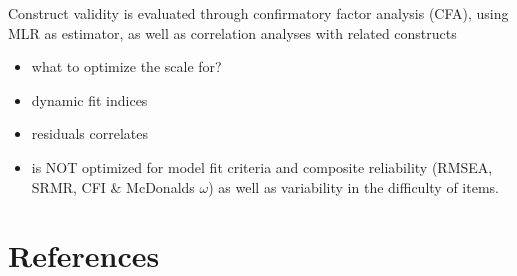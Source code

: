\documentclass[
  12pt,
  a4paper,
  twoside]{article}
\providecommand{\tightlist}{%
  \setlength{\itemsep}{0pt}\setlength{\parskip}{0pt}}
\begin{document}
Construct validity is evaluated through confirmatory factor analysis (CFA), using MLR as estimator, as well as correlation analyses with related constructs

\begin{itemize}
\tightlist
\item
  what to optimize the scale for?
\item
  dynamic fit indices
\item
  residuals correlates
\item
  is NOT optimized for model fit criteria and composite reliability (RMSEA, SRMR, CFI \& McDonalds \(\omega\)) as well as variability in the difficulty of items.
\end{itemize}

\section*{References}\label{references}
\end{document}
